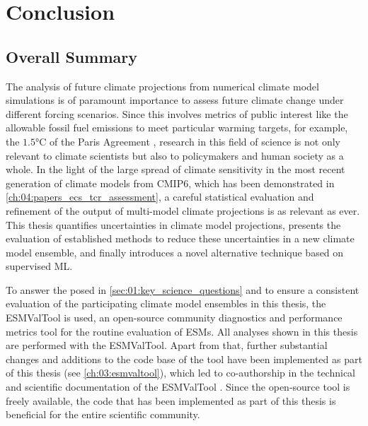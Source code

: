 
%



\chapter{Conclusion}
\label{ch:07:conclusion}


\section{Overall Summary}
\label{sec:07:overall_summary}

The analysis of future climate projections from numerical climate model
simulations is of paramount importance to assess future climate change under
different forcing scenarios. Since this involves metrics of public interest
like the allowable fossil fuel emissions to meet particular warming targets,
for example, the $1.5 \unit{\degreeCelsius}$ of the Paris Agreement
\autocite{UNFCCC2015}, research in this field of science is not only relevant
to climate scientists but also to policymakers and human society as a whole. In
the light of the large spread of climate sensitivity in the most recent
generation of climate models from \acs{CMIP}6, which has been demonstrated in
\cref{ch:04:papers_ecs_tcr_assessment}, a careful statistical evaluation and
refinement of the output of multi-model climate projections is as relevant as
ever. This thesis quantifies uncertainties in climate model projections,
presents the evaluation of established methods to reduce these uncertainties in
a new climate model ensemble, and finally introduces a novel alternative
technique based on supervised \ac{ML}.

To answer the  posed in
\cref{sec:01:key_science_questions} and to ensure a consistent evaluation of
the participating climate model ensembles in this thesis, the \ac{ESMValTool}
is used, an open-source community diagnostics and performance metrics tool for
the routine evaluation of \acp{ESM}. All analyses shown in this thesis are
performed with the \ac{ESMValTool}. Apart from that, further substantial
changes and additions to the code base of the tool have been implemented as
part of this thesis (see \cref{ch:03:esmvaltool}), which led to co-authorship
in the technical and scientific documentation of the \ac{ESMValTool}
\autocite{Eyring2020, Lauer2020, Righi2020, Weigel2020}. Since the open-source
tool is freely available, the code that has been implemented as part of this
thesis is beneficial for the entire scientific community.

